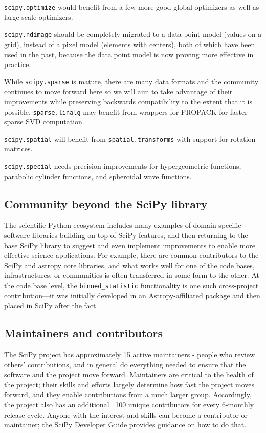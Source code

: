\documentclass[fleqn,10pt]{wlscirep}
\begin{document}
\texttt{scipy.optimize} would benefit from a few more good global optimizers 
as well as large-scale optimizers.

\texttt{scipy.ndimage} should be completely migrated to a data point
model (values on a grid), instead of a pixel model (elements with centers),
both of which have been used in the past, because the data point model is now
proving more effective in practice.

While \texttt{scipy.sparse} is mature, there are many data
formats and the community continues to move forward here so we will aim
to take advantage of their improvements\cite{abbasi2018sparse} 
while preserving backwards compatibility to the extent that it is possible.
\texttt{sparse.linalg} may benefit from wrappers for PROPACK 
for faster sparse SVD computation.

\texttt{scipy.spatial} will benefit from \texttt{spatial.transforms} with
support for rotation matrices.

\texttt{scipy.special} needs precision improvements for hypergeometric 
functions, parabolic cylinder functions, and spheroidal wave functions.

\subsection*{Community beyond the SciPy library}

The scientific Python ecosystem includes many examples
of domain-specific software libraries building on top
of SciPy features, and then returning to the base SciPy library
to suggest and even implement improvements to enable
more effective science applications. For example, there
are common contributors to the SciPy and astropy core
libraries\cite{astropy-2018}, and what works well for 
one of the code bases, infrastructures, or communities 
is often transferred in some form to the other. At the code
base level, the \texttt{binned\_statistic} functionality
is one such cross-project contribution---it was initially
developed in an Astropy-affiliated package
and then placed in SciPy after the fact.

\subsection*{Maintainers and contributors}

The SciPy project has approximately 15 active maintainers - people who review
others' contributions, and in general do everything needed to ensure that the
software and the project move forward. Maintainers are critical to the health
of the project\cite{eghbal2016}; their skills and efforts largely determine how
fast the project moves forward, and they enable contributions from a much
larger group. Accordingly, the project also has an additional ~100 unique
contributors for every 6-monthly release cycle. Anyone with the interest and
skills can become a contributor or maintainer; the SciPy Developer Guide
provides guidance on how to do that.
\end{document}

